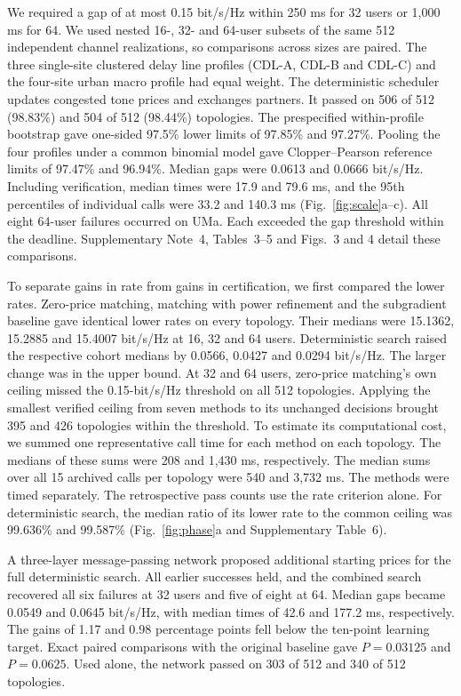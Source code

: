 \documentclass[11pt,letterpaper]{article}
\begin{document}
We required a gap of at most 0.15 bit/s/Hz within 250 ms for 32 users or 1,000 ms for 64. We used nested 16-, 32- and 64-user subsets of the same 512 independent channel realizations, so comparisons across sizes are paired. The three single-site clustered delay line profiles (CDL-A, CDL-B and CDL-C) and the four-site urban macro profile had equal weight. The deterministic scheduler updates congested tone prices and exchanges partners. It passed on 506 of 512 (98.83\%) and 504 of 512 (98.44\%) topologies. The prespecified within-profile bootstrap gave one-sided 97.5\% lower limits of 97.85\% and 97.27\%. Pooling the four profiles under a common binomial model gave Clopper--Pearson reference limits of 97.47\% and 96.94\%. Median gaps were 0.0613 and 0.0666 bit/s/Hz. Including verification, median times were 17.9 and 79.6 ms, and the 95th percentiles of individual calls were 33.2 and 140.3 ms (Fig.~\ref{fig:scale}a--c). All eight 64-user failures occurred on UMa. Each exceeded the gap threshold within the deadline. Supplementary Note~4, Tables~3--5 and Figs.~3 and 4 detail these comparisons.


To separate gains in rate from gains in certification, we first compared the lower rates. Zero-price matching, matching with power refinement and the subgradient baseline gave identical lower rates on every topology. Their medians were 15.1362, 15.2885 and 15.4007 bit/s/Hz at 16, 32 and 64 users. Deterministic search raised the respective cohort medians by 0.0566, 0.0427 and 0.0294 bit/s/Hz. The larger change was in the upper bound. At 32 and 64 users, zero-price matching's own ceiling missed the 0.15-bit/s/Hz threshold on all 512 topologies. Applying the smallest verified ceiling from seven methods to its unchanged decisions brought 395 and 426 topologies within the threshold. To estimate its computational cost, we summed one representative call time for each method on each topology. The medians of these sums were 208 and 1,430 ms, respectively. The median sums over all 15 archived calls per topology were 540 and 3,732 ms. The methods were timed separately. The retrospective pass counts use the rate criterion alone. For deterministic search, the median ratio of its lower rate to the common ceiling was 99.636\% and 99.587\% (Fig.~\ref{fig:phase}a and Supplementary Table~6).


A three-layer message-passing network proposed additional starting prices for the full deterministic search. All earlier successes held, and the combined search recovered all six failures at 32 users and five of eight at 64. Median gaps became 0.0549 and 0.0645 bit/s/Hz, with median times of 42.6 and 177.2 ms, respectively. The gains of 1.17 and 0.98 percentage points fell below the ten-point learning target. Exact paired comparisons with the original baseline gave \(P=0.03125\) and \(P=0.0625\). Used alone, the network passed on 303 of 512 and 340 of 512 topologies.
\end{document}
